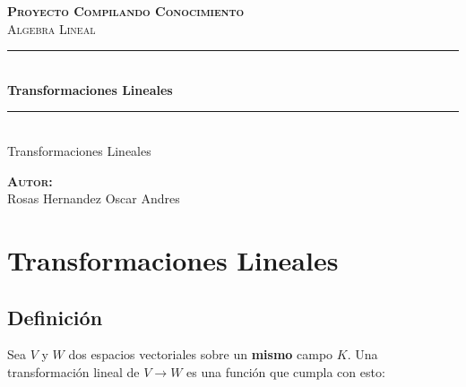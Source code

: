 \documentclass[12pt]{report}                                    %
\author{Oscar Andrés Rosas}                                     %
\begin{document}
\begin{titlepage}

    \center
    \textbf{\textsc{\Large Proyecto Compilando Conocimiento}}\\[1.0cm] 
    \textsc{\Large Algebra Lineal}\\[1.0cm] 

    \rule{\linewidth}{0.5mm} \\[1.0cm]
        { \huge \bfseries Transformaciones Lineales}\\[1.0cm] 
    \rule{\linewidth}{0.5mm} \\[2.0cm]
    
    {\LARGE Transformaciones Lineales}\\[7cm] 
    
    \begin{center} \large
    \textbf{\textsc{Autor:}}\\
    Rosas Hernandez Oscar Andres
    \end{center}

    \vfill

\end{titlepage}


\tableofcontents{}
\label{sec:Index}


\clearpage

\chapter{Transformaciones Lineales}
\label{sec:TransformacionesLineales}
    \clearpage

    \section{Definición}
        Sea $V$ y $W$ dos espacios vectoriales sobre un \textbf{mismo} campo $K$. Una
        transformación lineal de $V \to W$ es una función que cumpla con esto:
\end{document}
